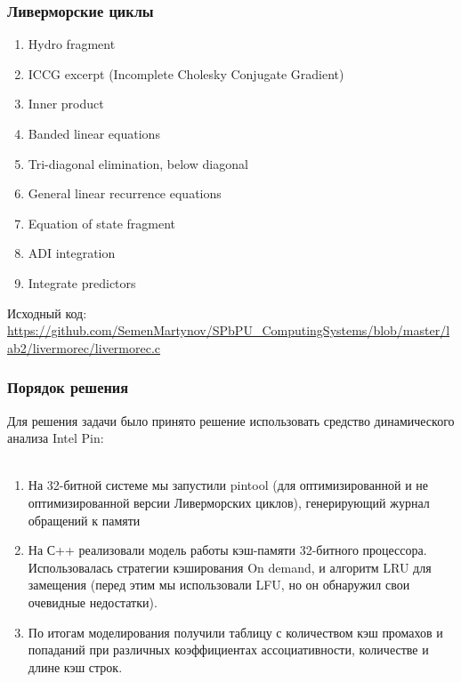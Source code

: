 \documentclass{beamer}
\begin{document}

\begin{frame}
\frametitle{Ливерморские циклы}
\begin{enumerate}
\item Hydro fragment
\item ICCG excerpt (Incomplete Cholesky Conjugate Gradient)
\item Inner product
\item Banded linear equations
\item Tri-diagonal elimination, below diagonal
\item General linear recurrence equations
\item Equation of state fragment
\item ADI integration
\item Integrate predictors
\end{enumerate}
Исходный код:\\ \url{https://github.com/SemenMartynov/SPbPU_ComputingSystems/blob/master/lab2/livermorec/livermorec.c}
\end{frame}


\begin{frame}
\frametitle{Порядок решения}

Для решения задачи было принято решение использовать средство динамического анализа Intel Pin:\\~\\

\begin{enumerate}
\item На 32-битной системе мы запустили pintool (для оптимизированной и не оптимизированной версии Ливерморских циклов), генерирующий журнал обращений к памяти
\item На С++ реализовали модель работы кэш-памяти 32-битного процессора. Использовалась стратегии кэширования On demand, и алгоритм LRU для замещения (перед этим мы использовали LFU, но он обнаружил свои очевидные недостатки).
\item По итогам моделирования получили таблицу с количеством кэш промахов и попаданий при различных коэффициентах ассоциативности, количестве и длине кэш строк.
\end{enumerate}

\end{frame}

\end{document}
